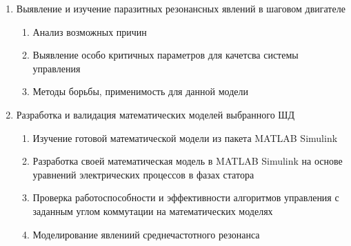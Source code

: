 \begin{enumerate}
    \item{Выявление и изучение паразитных резонансных явлений в шаговом двигателе}
        \begin{enumerate}
            \item Анализ возможных причин
            \item Выявление особо критичных параметров для качетсва системы управления
            \item Методы борьбы, применимость для данной модели
        \end{enumerate}

    \item{Разработка и валидация математических моделей выбранного ШД}
        \begin{enumerate}
            \item Изучение готовой математической модели из пакета MATLAB Simulink
            \item Разработка своей математическая модель в MATLAB Simulink на основе
                    уравнений электрических процессов в фазах статора
            \item Проверка работоспособности и эффективности алгоритмов управления с заданным углом
                    коммутации на математических моделях
            \item Моделирование явлениий среднечастотного резонанса
        \end{enumerate}
\end{enumerate}

\newpage
